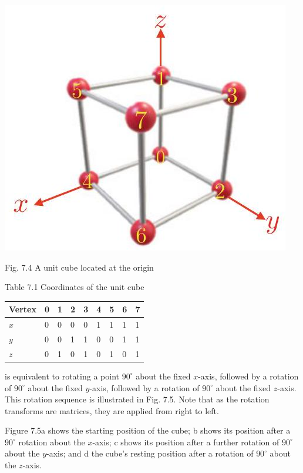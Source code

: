 \documentclass[10pt]{article}
\begin{document}
\begin{center}
\includegraphics[max width=\textwidth]{2023_04_20_41f1ceac5a31dc7d1b59g-119}
\end{center}

Fig. 7.4 A unit cube located at the origin

Table 7.1 Coordinates of the unit cube

\begin{center}
\begin{tabular}{l|l|l|l|l|l|l|l|l}
\hline
Vertex & 0 & 1 & 2 & 3 & 4 & 5 & 6 & 7 \\
\hline
$x$ & 0 & 0 & 0 & 0 & 1 & 1 & 1 & 1 \\
\hline
$y$ & 0 & 0 & 1 & 1 & 0 & 0 & 1 & 1 \\
\hline
$z$ & 0 & 1 & 0 & 1 & 0 & 1 & 0 & 1 \\
\hline
\end{tabular}
\end{center}

is equivalent to rotating a point $90^{\circ}$ about the fixed $x$-axis, followed by a rotation of $90^{\circ}$ about the fixed $y$-axis, followed by a rotation of $90^{\circ}$ about the fixed $z$-axis. This rotation sequence is illustrated in Fig. 7.5. Note that as the rotation transforms are matrices, they are applied from right to left.

Figure 7.5a shows the starting position of the cube; b shows its position after a $90^{\circ}$ rotation about the $x$-axis; c shows its position after a further rotation of $90^{\circ}$ about the $y$-axis; and d the cube's resting position after a rotation of $90^{\circ}$ about the $z$-axis.
\end{document}
